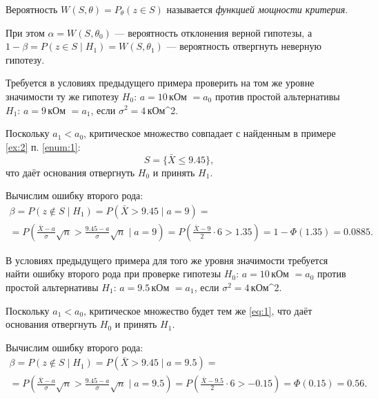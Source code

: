 \begin{definition}
Вероятность $W(S, \theta) = P_\theta(z\in S)$ называется \emph{функцией мощности
критерия}.
\end{definition}

При этом $ \alpha = W(S, \theta_0) $ --- вероятность отклонения верной гипотезы,
а $ 1-\beta = P(z \in S \mid H_1) = W(S, \theta_1) $ --- вероятность отвергнуть
неверную гипотезу.

\begin{ex}
	Требуется в условиях предыдущего примера проверить на том же уровне значимости
	ту же гипотезу $ H_0 $: $ a = 10 $\,кОм $ = a_0 $ против простой альтернативы
	$ H_1 $: $ a = 9 $\,кОм $ = a_1 $, если $ \sigma^2 = 4 $\,кОм^2. 
	\begin{solution}
		Поскольку $ a_1 < a_0 $, критическое множество совпадает с найденным в
		примере \ref{ex:2} п. \ref{enum:1}:  
		\begin{equation}\label{eq:1}
			S = \{\bar X \leqslant 9.45\},
		\end{equation}
		что даёт основания отвергнуть $ H_0 $ и принять $ H_1 $. 

		Вычислим ошибку	второго рода: 
		\begin{multline*}
				\beta = P(z \notin S \mid H_1) = P(\bar X > 9.45 \mid a = 9) =\\= P \left(
				\frac{\bar X - a}{\sigma}\sqrt n > \frac{9.45 - a}{\sigma}\sqrt n \mid a
			= 9\right) = P \left( \frac{\bar X - 9}{2} \cdot 6 > 1.35 \right) = 1 -
			\Phi(1.35) = 0.0885.
		\end{multline*}

	\end{solution}
\end{ex}
\begin{ex}
	В условиях предыдущего примера для того же уровня значимости требуется найти
	ошибку второго рода при проверке гипотезы $ H_0 $: $ a =10 $\,кОм $ = a_0 $
	против простой альтернативы $ H_1 $: $ a = 9.5 $\,кОм $ = a_1 $, если $
	\sigma^2 = 4 $\,кОм^2.
	\begin{solution}
		Поскольку $ a_1 < a_0 $, критическое множество будет тем же \eqref{eq:1},
		что даёт основания отвергнуть $ H_0 $ и принять $ H_1 $.

		Вычислим ошибку второго рода: 
		\begin{multline*}
				\beta = P(z\notin S\mid H_1) = P(\bar X > 9.45 \mid a = 9.5) =\\=
				P \left(
				\frac{\bar X - a}{\sigma}\sqrt n> \frac{9.45 - a}{\sigma} \sqrt n\mid a
			= 9.5\right) = P \left( \frac{\bar X - 9.5}{2}\cdot 6 > -0.15 \right) =
			\Phi(0.15) = 0.56.
		\end{multline*}
	\end{solution}	
\end{ex}
